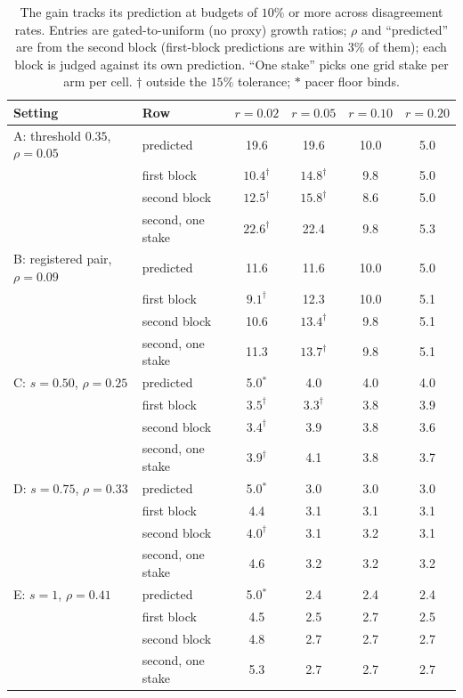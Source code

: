\begin{table}[!h]
\centering\small
\caption{The gain tracks its prediction at budgets of $10\%$ or more across disagreement rates. Entries are gated-to-uniform (no proxy) growth ratios; $\rho$ and ``predicted'' are from the second block (first-block predictions are within $3\%$ of them); each block is judged against its own prediction. ``One stake'' picks one grid stake per arm per cell. $\dagger$ outside the $15\%$ tolerance; $*$ pacer floor binds.}
\label{tab:rho}
\begin{tabular}{llcccc}
\toprule
Setting & Row & $r=0.02$ & $r=0.05$ & $r=0.10$ & $r=0.20$ \\
\midrule
A: threshold $0.35$, $\rho=0.05$ & predicted & 19.6 & 19.6 & 10.0 & 5.0 \\
 & first block & $10.4^\dagger$ & $14.8^\dagger$ & 9.8 & 5.0 \\
 & second block & $12.5^\dagger$ & $15.8^\dagger$ & 8.6 & 5.0 \\
 & second, one stake & $22.6^\dagger$ & 22.4 & 9.8 & 5.3 \\
\addlinespace
B: registered pair, $\rho=0.09$ & predicted & 11.6 & 11.6 & 10.0 & 5.0 \\
 & first block & $9.1^\dagger$ & 12.3 & 10.0 & 5.1 \\
 & second block & 10.6 & $13.4^\dagger$ & 9.8 & 5.1 \\
 & second, one stake & 11.3 & $13.7^\dagger$ & 9.8 & 5.1 \\
\addlinespace
C: $s=0.50$, $\rho=0.25$ & predicted & 5.0$^*$ & 4.0 & 4.0 & 4.0 \\
 & first block & $3.5^\dagger$ & $3.3^\dagger$ & 3.8 & 3.9 \\
 & second block & $3.4^\dagger$ & 3.9 & 3.8 & 3.6 \\
 & second, one stake & $3.9^\dagger$ & 4.1 & 3.8 & 3.7 \\
\addlinespace
D: $s=0.75$, $\rho=0.33$ & predicted & 5.0$^*$ & 3.0 & 3.0 & 3.0 \\
 & first block & 4.4 & 3.1 & 3.1 & 3.1 \\
 & second block & $4.0^\dagger$ & 3.1 & 3.2 & 3.1 \\
 & second, one stake & 4.6 & 3.2 & 3.2 & 3.2 \\
\addlinespace
E: $s=1$, $\rho=0.41$ & predicted & 5.0$^*$ & 2.4 & 2.4 & 2.4 \\
 & first block & 4.5 & 2.5 & 2.7 & 2.5 \\
 & second block & 4.8 & 2.7 & 2.7 & 2.7 \\
 & second, one stake & 5.3 & 2.7 & 2.7 & 2.7 \\
\bottomrule
\end{tabular}
\end{table}

